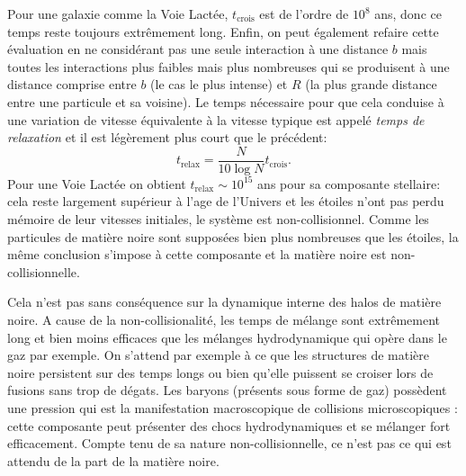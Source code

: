 Pour une galaxie comme la Voie Lactée, $t_\mathrm{crois}$ est de l'ordre de $10^8$ ans, donc ce temps reste toujours extrêmement long. Enfin, on peut également refaire cette évaluation en ne considérant pas une seule interaction à une distance $b$ mais toutes les interactions plus faibles mais plus nombreuses qui se produisent à une distance comprise entre $b$ (le cas le plus intense) et $R$ (la plus grande distance entre une particule et sa voisine). Le temps nécessaire pour que cela conduise à une variation de vitesse équivalente à la vitesse typique est appelé \textit{temps de relaxation} et il est légèrement plus court que le précédent:
\begin{equation}
t_\mathrm{relax}=\frac{N}{10\log N} t_\mathrm{crois}.
\end{equation}
Pour une Voie Lactée on obtient $t_\mathrm{relax} \sim 10^{15}$ ans pour sa composante stellaire: cela reste largement supérieur à l'age de l'Univers et les étoiles n'ont pas perdu mémoire de leur vitesses initiales, le système est non-collisionnel. Comme les particules de matière noire sont supposées bien plus nombreuses que les étoiles, la même conclusion s'impose à cette composante et la matière noire est non-collisionnelle.

Cela n'est pas sans conséquence sur la dynamique interne des halos de matière noire. A cause de la non-collisionalité, les temps de mélange sont extrêmement long et bien moins efficaces que les mélanges hydrodynamique qui opère dans le gaz par exemple. On s'attend par exemple à ce que les structures de matière noire persistent sur des temps longs ou bien qu'elle puissent se croiser lors de fusions sans trop de dégats. Les baryons (présents sous forme de gaz) possèdent une pression qui est la manifestation macroscopique de collisions microscopiques : cette composante peut présenter des chocs hydrodynamiques et se mélanger fort efficacement. Compte tenu de sa nature non-collisionnelle, ce n'est pas ce qui est attendu de la part de la matière noire.


